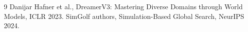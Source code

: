 \documentclass{article}
\begin{document}


\begin{thebibliography}{9}
Danijar Hafner et al., DreamerV3: Mastering Diverse Domains through World Models, ICLR 2023.
SimGolf authors, Simulation-Based Global Search, NeurIPS 2024.
\end{thebibliography}
\end{document}
